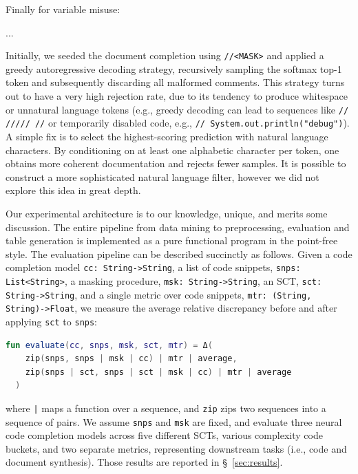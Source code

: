 \documentclass[usenames,dvipsnames]{article} %
\begin{document}
  Finally for variable misuse:

  ...

  Initially, we seeded the document completion using \lstinline|//<MASK>| and applied a greedy autoregressive decoding strategy, recursively sampling the softmax top-1 token and subsequently discarding all malformed comments. This strategy turns out to have a very high rejection rate, due to its tendency to produce whitespace or unnatural language tokens (e.g., greedy decoding can lead to sequences like \lstinline|// ///// //| or temporarily disabled code, e.g., \lstinline|// System.out.println("debug")|). A simple fix is to select the highest-scoring prediction with natural language characters. By conditioning on at least one alphabetic character per token, one obtains more coherent documentation and rejects fewer samples. It is possible to construct a more sophisticated natural language filter, however we did not explore this idea in great depth.

  Our experimental architecture is to our knowledge, unique, and merits some discussion. The entire pipeline from data mining to preprocessing, evaluation and table generation is implemented as a pure functional program in the point-free style. The evaluation pipeline can be described succinctly as follows. Given a code completion model \lstinline|cc: String->String|, a list of code snippets, \lstinline|snps: List<String>|, a masking procedure, \lstinline|msk: String->String|, an SCT, \lstinline|sct: String->String|, and a single metric over code snippets, \lstinline|mtr: (String, String)->Float|, we measure the average relative discrepancy before and after applying \lstinline|sct| to \lstinline|snps|:

  \noindent\begin{lstlisting}[basicstyle=\footnotesize\ttfamily, language=kotlin,label={lst:lstlisting}]
  fun evaluate(cc, snps, msk, sct, mtr) = Δ(
    zip(snps, snps | msk | cc) | mtr | average,
    zip(snps | sct, snps | sct | msk | cc) | mtr | average
  )
  \end{lstlisting}

  \noindent where \texttt{|} maps a function over a sequence, and \lstinline|zip| zips two sequences into a sequence of pairs. We assume \lstinline|snps| and \lstinline|msk| are fixed, and evaluate three neural code completion models across five different SCTs, various complexity code buckets, and two separate metrics, representing downstream tasks (i.e., code and document synthesis). Those results are reported in \S~\ref{sec:results}.
\end{document}
